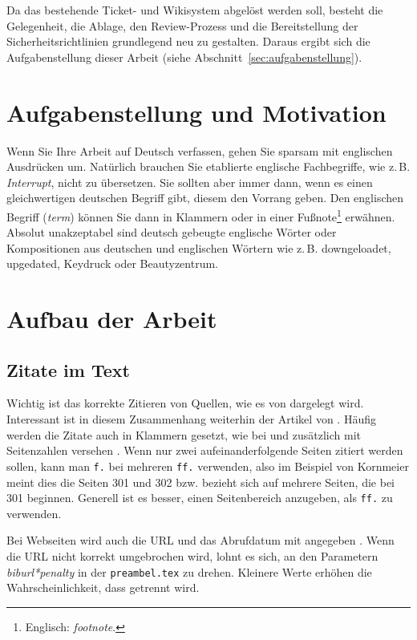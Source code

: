 Da das bestehende Ticket- und Wikisystem abgelöst werden soll, besteht die Gelegenheit, die Ablage, den Review-Prozess und die Bereitstellung der Sicherheitsrichtlinien grundlegend neu zu gestalten.
Daraus ergibt sich die Aufgabenstellung dieser Arbeit (siehe Abschnitt~\ref{sec:aufgabenstellung}).

\section{Aufgabenstellung und Motivation}

Wenn Sie Ihre Arbeit auf Deutsch verfassen, gehen Sie sparsam mit englischen Ausdrücken um. Natürlich brauchen Sie etablierte englische Fachbegriffe, wie z.\,B. \textit{Interrupt}, nicht zu übersetzen. Sie sollten aber immer dann, wenn es einen gleichwertigen deutschen Begriff gibt, diesem den Vorrang geben. Den englischen Begriff (\textit{term}) können Sie dann in Klammern oder in einer Fußnote\footnote{Englisch: \textit{footnote}.} erwähnen. Absolut unakzeptabel sind deutsch gebeugte englische Wörter oder Kompositionen aus deutschen und englischen Wörtern wie z.\,B. downgeloadet, upgedated, Keydruck oder Beautyzentrum.

\section{Aufbau der Arbeit}

\subsection{Zitate im Text}

Wichtig ist das korrekte Zitieren von Quellen, wie es \zb{} von \cite{Kornmeier2011} dargelegt wird. Interessant ist in diesem Zusammenhang weiterhin der Artikel von \cite{Kramer2009}. Häufig werden die Zitate auch in Klammern gesetzt, wie bei \parencite{Kornmeier2011} und zusätzlich mit Seitenzahlen versehen \parencite[S. 301--303]{Kornmeier2011}. Wenn nur zwei aufeinanderfolgende Seiten zitiert werden sollen, kann man \texttt{f.} bei mehreren \texttt{ff.} verwenden, also im Beispiel von Kornmeier \parencite[S. 301 f.]{Kornmeier2011} meint dies die Seiten 301 und 302 bzw. \parencite[S. 301 ff.]{Kornmeier2011} bezieht sich auf mehrere Seiten, die bei 301 beginnen. Generell ist es besser, einen Seitenbereich anzugeben, als \texttt{ff.} zu verwenden.

Bei Webseiten wird auch die URL und das Abrufdatum mit angegeben \parencite{Gao2017}. Wenn die URL nicht korrekt umgebrochen wird, lohnt es sich, an den Parametern \textit{biburl*penalty} in der \texttt{preambel.tex} zu drehen. Kleinere Werte erhöhen die Wahrscheinlichkeit, dass getrennt wird.

